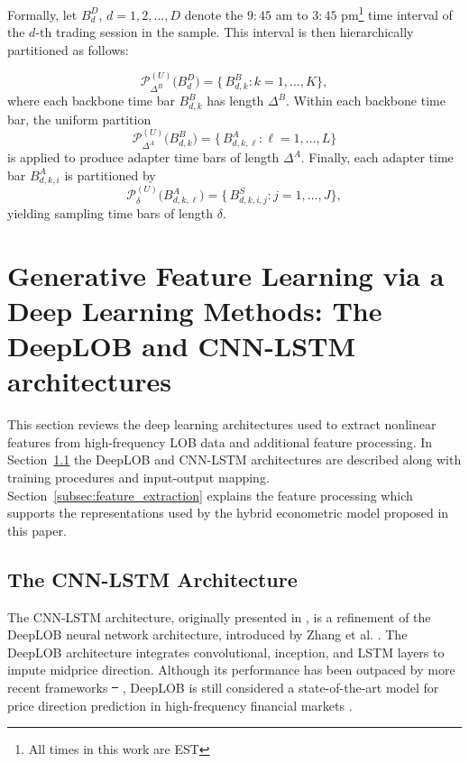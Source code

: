 \documentclass[10pt,a4paper,oneside]{article}
\makeatletter
\providecommand{\DIFaddtex}[1]{{\protect\color{blue}\uwave{#1}}} %
\providecommand{\DIFdeltex}[1]{{\protect\color{red}\sout{#1}}} %
\providecommand{\DIFaddbegin}{} %
\providecommand{\DIFaddend}{} %
\providecommand{\DIFdelbegin}{} %
\providecommand{\DIFdelend}{} %
\providecommand{\DIFadd}[1]{\texorpdfstring{\DIFaddtex{#1}}{#1}} %
\providecommand{\DIFdel}[1]{\texorpdfstring{\DIFdeltex{#1}}{}} %
\newcommand{\DIFscaledelfig}{0.5}
\newlength{\DIFdelgraphicswidth} %
\newlength{\DIFdelgraphicsheight} %
\newcommand{\DIFaddincludegraphics}[2][]{{\color{blue}\fbox{\DIFOincludegraphics[#1]{#2}}}} %
\newcommand{\DIFdelincludegraphics}[2][]{%
\sbox{\DIFdelgraphicsbox}{\DIFOincludegraphics[#1]{#2}}%
\settoboxwidth{\DIFdelgraphicswidth}{\DIFdelgraphicsbox} %
\settoboxtotalheight{\DIFdelgraphicsheight}{\DIFdelgraphicsbox} %
\scalebox{\DIFscaledelfig}{%
\parbox[b]{\DIFdelgraphicswidth}{\usebox{\DIFdelgraphicsbox}\\[-\baselineskip] \rule{\DIFdelgraphicswidth}{0em}}\llap{\resizebox{\DIFdelgraphicswidth}{\DIFdelgraphicsheight}{%
\setlength{\unitlength}{\DIFdelgraphicswidth}%
\begin{picture}(1,1)%
\thicklines\linethickness{2pt} %
{\color[rgb]{1,0,0}\put(0,0){\framebox(1,1){}}}%
{\color[rgb]{1,0,0}\put(0,0){\line( 1,1){1}}}%
{\color[rgb]{1,0,0}\put(0,1){\line(1,-1){1}}}%
\end{picture}%
}\hspace*{3pt}}} %
} %
\DeclareRobustCommand{\DIFaddbegin}{\DIFOaddbegin \let\includegraphics\DIFaddincludegraphics} %
\DeclareRobustCommand{\DIFaddend}{\DIFOaddend \let\includegraphics\DIFOincludegraphics} %
\DeclareRobustCommand{\DIFdelbegin}{\DIFOdelbegin \let\includegraphics\DIFdelincludegraphics} %
\DeclareRobustCommand{\DIFdelend}{\DIFOaddend \let\includegraphics\DIFOincludegraphics} %
\let\sout@orig\sout %
\renewcommand{\sout}[1]{\ifmmode\text{\sout@orig{\ensuremath{#1}}}\else\sout@orig{#1}\fi} %
\makeatother
\begin{document}
Formally, let $B^D_d$, $d = 1, 2, \dots, D$ denote the $9:45$ am to $3:45$ pm\footnote{All times in this work are EST} time interval of the $d$-th trading session in the sample. This interval is then hierarchically partitioned as follows:

\[
    \mathcal P^{(U)}_{\Delta^B}\bigl(B^D_d\bigr)
    =\{\,B^B_{d,k}:k=1,\dots,K\},
\]
where each backbone time bar \(B^B_{d,k}\) has length \(\Delta^B\).  Within each backbone time bar, the uniform partition
\[
    \mathcal P^{(U)}_{\Delta^A}\bigl(B^B_{d,k}\bigr)
    =\{\,B^A_{d,k,\ell}:\ell=1,\dots,L\}
\]
is applied to produce adapter time bars of length \(\Delta^A\).  Finally, each adapter time bar \(B^A_{d,k,i}\) is partitioned by
\[
    \mathcal P^{(U)}_{\delta}\bigl(B^A_{d,k,\ell}\bigr)
    =\{\,B^S_{d,k,i,j}:j=1,\dots,J\},
\]
yielding sampling time bars of length \(\delta\).

\section{Generative Feature Learning via a Deep Learning Methods: The DeepLOB and CNN-LSTM architectures}
\label{Sect:Features}
This section reviews the deep learning architectures used to extract nonlinear features from high-frequency LOB data and additional feature processing. In Section~\ref{subsec:cnn_lstm} the DeepLOB \cite{zhang2021deeplearningmarketorder} and CNN-LSTM architectures \cite{kolm2023deep} are described along with training procedures and input-output mapping. Section~\ref{subsec:feature_extraction} explains the feature processing which supports the representations used by the hybrid econometric model proposed in this paper.
\DIFdelbegin %

\DIFdelend %
\subsection{The CNN-LSTM Architecture}
\label{subsec:cnn_lstm}
The CNN-LSTM architecture, originally presented in \cite{kolm2023deep}, is a refinement of the DeepLOB neural network architecture, introduced by Zhang et al. \cite{Zhang_2019}. The DeepLOB architecture integrates convolutional, inception, and LSTM layers to impute midprice direction. Although its performance has been outpaced by more recent frameworks \DIFdelbegin \DIFdel{\mbox{%
\cite{prata2023lobbased}}\hskip0pt%
}\DIFdelend \DIFaddbegin \DIFadd{\mbox{%
\cite{prata2024lob}}\hskip0pt%
}\DIFaddend , DeepLOB is still considered a state-of-the-art model for price direction prediction in high-frequency financial markets \cite{briola2024deep, kolm2023deep}. \DIFdelbegin %
\end{document}
